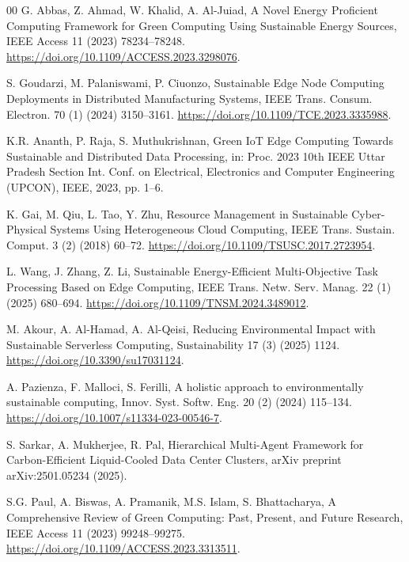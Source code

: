 \documentclass[a4paper,fleqn]{cas-dc}
\begin{document}
\begin{thebibliography}{00}
G. Abbas, Z. Ahmad, W. Khalid, A. Al-Juiad, A Novel Energy Proficient Computing Framework for Green Computing Using Sustainable Energy Sources, IEEE Access 11 (2023) 78234--78248. \url{https://doi.org/10.1109/ACCESS.2023.3298076}.

S. Goudarzi, M. Palaniswami, P. Ciuonzo, Sustainable Edge Node Computing Deployments in Distributed Manufacturing Systems, IEEE Trans. Consum. Electron. 70 (1) (2024) 3150--3161. \url{https://doi.org/10.1109/TCE.2023.3335988}.

K.R. Ananth, P. Raja, S. Muthukrishnan, Green IoT Edge Computing Towards Sustainable and Distributed Data Processing, in: Proc. 2023 10th IEEE Uttar Pradesh Section Int. Conf. on Electrical, Electronics and Computer Engineering (UPCON), IEEE, 2023, pp. 1--6.

K. Gai, M. Qiu, L. Tao, Y. Zhu, Resource Management in Sustainable Cyber-Physical Systems Using Heterogeneous Cloud Computing, IEEE Trans. Sustain. Comput. 3 (2) (2018) 60--72. \url{https://doi.org/10.1109/TSUSC.2017.2723954}.

L. Wang, J. Zhang, Z. Li, Sustainable Energy-Efficient Multi-Objective Task Processing Based on Edge Computing, IEEE Trans. Netw. Serv. Manag. 22 (1) (2025) 680--694. \url{https://doi.org/10.1109/TNSM.2024.3489012}.

M. Akour, A. Al-Hamad, A. Al-Qeisi, Reducing Environmental Impact with Sustainable Serverless Computing, Sustainability 17 (3) (2025) 1124. \url{https://doi.org/10.3390/su17031124}.

A. Pazienza, F. Malloci, S. Ferilli, A holistic approach to environmentally sustainable computing, Innov. Syst. Softw. Eng. 20 (2) (2024) 115--134. \url{https://doi.org/10.1007/s11334-023-00546-7}.

S. Sarkar, A. Mukherjee, R. Pal, Hierarchical Multi-Agent Framework for Carbon-Efficient Liquid-Cooled Data Center Clusters, arXiv preprint arXiv:2501.05234 (2025).

S.G. Paul, A. Biswas, A. Pramanik, M.S. Islam, S. Bhattacharya, A Comprehensive Review of Green Computing: Past, Present, and Future Research, IEEE Access 11 (2023) 99248--99275. \url{https://doi.org/10.1109/ACCESS.2023.3313511}.



\end{thebibliography}
\end{document}
